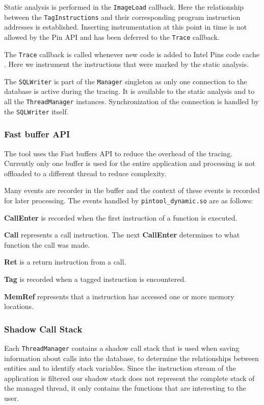 Static analysis is performed in the \texttt{ImageLoad} callback. Here the relationship between the \texttt{TagInstructions} and their corresponding program instruction addresses is established. Inserting instrumentation at this point in time is not allowed by the Pin API and has been deferred to the \texttt{Trace} callback.

The \texttt{Trace} callback is called whenever new code is added to Intel Pins code cache \cite{pindoc}. Here we instrument the instructions that were marked by the static analysis.

The \texttt{SQLWriter} is part of the \texttt{Manager} singleton as only one connection to the database is active during the tracing. It is available to the static analysis and to all the \texttt{ThreadManager} instances. Synchronization of the connection is handled by the \texttt{SQLWriter} itself. 

\subsubsection{Fast buffer API}

The tool uses the Fast buffers API to reduce the overhead of the tracing. Currently only one buffer is used for the entire application and processing is not offloaded to a different thread to reduce complexity.

Many events are recorder in the buffer and the context of these events is recorded for later processing. The events handled by \texttt{pintool\_dynamic.so} are as follows:

\textbf{CallEnter} is recorded when the first instruction of a function is executed.

\textbf{Call} represents a call instruction. The next \textbf{CallEnter} determines to what function the call was made. 

\textbf{Ret} is a return instruction from a call.

\textbf{Tag} is recorded when a tagged instruction is encountered.

\textbf{MemRef} represents that a instruction has accessed one or more memory locations.

\subsubsection{Shadow Call Stack}

Each \texttt{ThreadManager} contains a shadow call stack that is used when saving information about calls into the database, to determine the relationships between entities and to identify stack variables. Since the instruction stream of the application is filtered our shadow stack does not represent the complete stack of the managed thread, it only contains the functions that are interesting to the user.

